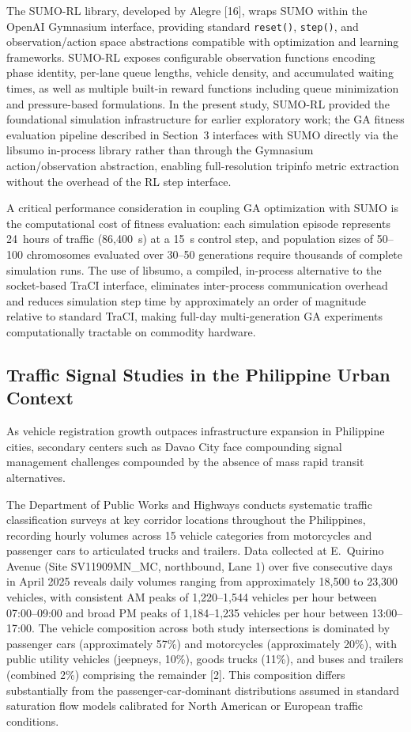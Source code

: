 \documentclass[a4paper,10pt]{article}
\begin{document}
	The SUMO-RL library, developed by Alegre [16], wraps SUMO within the OpenAI Gymnasium interface, providing standard \texttt{reset()}, \texttt{step()}, and observation/action space abstractions compatible with optimization and learning frameworks. SUMO-RL exposes configurable observation functions encoding phase identity, per-lane queue lengths, vehicle density, and accumulated waiting times, as well as multiple built-in reward functions including queue minimization and pressure-based formulations. In the present study, SUMO-RL provided the foundational simulation infrastructure for earlier exploratory work; the GA fitness evaluation pipeline described in Section~3 interfaces with SUMO directly via the libsumo in-process library rather than through the Gymnasium action/observation abstraction, enabling full-resolution tripinfo metric extraction without the overhead of the RL step interface.
	
	A critical performance consideration in coupling GA optimization with SUMO is the computational cost of fitness evaluation: each simulation episode represents 24~hours of traffic (86,400~s) at a 15~s control step, and population sizes of 50--100 chromosomes evaluated over 30--50 generations require thousands of complete simulation runs. The use of libsumo, a compiled, in-process alternative to the socket-based TraCI interface, eliminates inter-process communication overhead and reduces simulation step time by approximately an order of magnitude relative to standard TraCI, making full-day multi-generation GA experiments computationally tractable on commodity hardware.
	
	\subsection{Traffic Signal Studies in the Philippine Urban Context}
	
	As vehicle registration growth outpaces infrastructure expansion in Philippine cities, secondary centers such as Davao City face compounding signal management challenges compounded by the absence of mass rapid transit alternatives.
	
	The Department of Public Works and Highways conducts systematic traffic classification surveys at key corridor locations throughout the Philippines, recording hourly volumes across 15 vehicle categories from motorcycles and passenger cars to articulated trucks and trailers. Data collected at E.~Quirino Avenue (Site SV11909MN\_MC, northbound, Lane 1) over five consecutive days in April 2025 reveals daily volumes ranging from approximately 18,500 to 23,300 vehicles, with consistent AM peaks of 1,220--1,544 vehicles per hour between 07:00--09:00 and broad PM peaks of 1,184--1,235 vehicles per hour between 13:00--17:00. The vehicle composition across both study intersections is dominated by passenger cars (approximately 57\%) and motorcycles (approximately 20\%), with public utility vehicles (jeepneys, 10\%), goods trucks (11\%), and buses and trailers (combined 2\%) comprising the remainder [2]. This composition differs substantially from the passenger-car-dominant distributions assumed in standard saturation flow models calibrated for North American or European traffic conditions.
	
\end{document}
